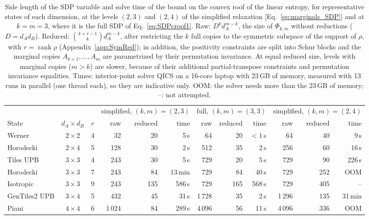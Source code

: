 \begin{table}
  \centering
  \begin{tabular}{l c c rrr rrr rrr}
    \toprule
    & & & \multicolumn{3}{c}{simplified, $(k,m)=(2,3)$} & \multicolumn{3}{c}{full, $(k,m)=(3,3)$} & \multicolumn{3}{c}{simplified, $(k,m)=(2,4)$} \\
    \cmidrule(lr){4-6}\cmidrule(lr){7-9}\cmidrule(lr){10-12}
    State & $d_A\times d_B$ & $r$ & raw & reduced & time & raw & reduced & time & raw & reduced & time \\
    \midrule
        Werner & $2\times2$ & 4 & 32 & 20 & 5\,s & 64 & 20 & $<1$\,s & 64 & 40 & 9\,s \\
    Horodecki & $2\times4$ & 5 & 128 & 30 & 2\,s & 512 & 35 & 2\,s & 256 & 60 & 16\,s \\
    Tiles UPB & $3\times3$ & 4 & 243 & 30 & 5\,s & 729 & 20 & 5\,s & 729 & 90 & 226\,s \\
    Horodecki & $3\times3$ & 7 & 243 & 84 & 13\,min & 729 & 84 & 40\,s & 729 & 252 & OOM \\
    Isotropic & $3\times3$ & 9 & 243 & 135 & 586\,s & 729 & 165 & 568\,s & 729 & 405 & -- \\
    GenTiles2 UPB & $3\times4$ & 5 & 432 & 45 & 31\,s & 1\,728 & 35 & 2\,s & 1\,296 & 135 & 31\,min \\
    Piani & $4\times4$ & 6 & 1\,024 & 84 & 289\,s & 4\,096 & 56 & 11\,s & 4\,096 & 336 & OOM \\
    \bottomrule
  \end{tabular}
  \caption{Side length of the SDP variable and solve time of the bound on the convex roof of the linear entropy, for
  representative states of each dimension, at the levels $(2,3)$ and $(2,4)$ of the simplified relaxation
  [Eq.~\eqref{eq:marginals_SDP}] and at $k=m=3$, where it is the full SDP of Eq.~\eqref{eq:SDPcroof1}. Raw:
  $D^k d_A^{m-k}$, the size of $\Phi_{k,m}$ without reductions ($D=d_Ad_B$). Reduced: $\binom{k+r-1}{k}d_A^{m-k}$,
  after restricting the $k$ full copies to the symmetric subspace of the support of $\rho$, with $r=\operatorname{rank}\rho$
  (Appendix~\ref{app:SymRed}); in addition, the positivity constraints are split into Schur blocks and the marginal
  copies $A_{k+1},\dots,A_m$ are parametrized by their permutation invariance. At equal reduced size, levels with
  marginal copies ($m>k$) are slower, because of their additional partial-transpose constraints and permutation
  invariance equalities. Times: interior-point solver QICS on a
  16-core laptop with 23\,GB of memory, measured with 13 runs in parallel (one thread each), so they are indicative
  only. OOM: the solver needs more than the 23\,GB of memory; --: not attempted.}
  \label{tab:dimensions}
\end{table}
